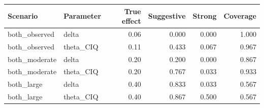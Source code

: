 \begin{tabular}{@{}llrrrr@{}}
\toprule
Scenario & Parameter & True effect & Suggestive & Strong & Coverage \\
\midrule
both\_observed & delta & 0.06 & 0.000 & 0.000 & 1.000 \\
both\_observed & theta\_CIQ & 0.11 & 0.433 & 0.067 & 0.967 \\
both\_moderate & delta & 0.20 & 0.200 & 0.000 & 0.867 \\
both\_moderate & theta\_CIQ & 0.20 & 0.767 & 0.033 & 0.933 \\
both\_large & delta & 0.40 & 0.833 & 0.033 & 0.567 \\
both\_large & theta\_CIQ & 0.40 & 0.867 & 0.500 & 0.567 \\
\bottomrule
\end{tabular}
